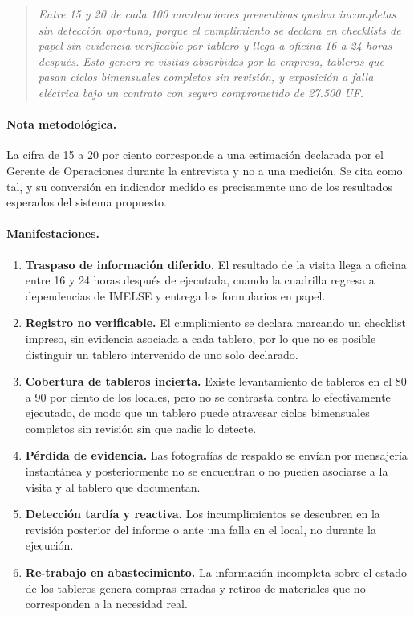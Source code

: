 \documentclass[10pt,letterpaper]{article}
\begin{document}
\begin{quote}
\itshape
Entre 15 y 20 de cada 100 mantenciones preventivas quedan incompletas sin detección
oportuna, porque el cumplimiento se declara en checklists de papel sin evidencia
verificable por tablero y llega a oficina 16 a 24 horas después. Esto genera
re-visitas absorbidas por la empresa, tableros que pasan ciclos bimensuales completos
sin revisión, y exposición a falla eléctrica bajo un contrato con seguro comprometido
de 27.500 UF.
\end{quote}

\paragraph{Nota metodológica.} La cifra de 15 a 20 por ciento corresponde a una
estimación declarada por el Gerente de Operaciones durante la entrevista y no a una
medición. Se cita como tal, y su conversión en indicador medido es precisamente uno
de los resultados esperados del sistema propuesto.

\paragraph{Manifestaciones.}
\begin{enumerate}[label=P\arabic*.,leftmargin=*]
  \item \textbf{Traspaso de información diferido.} El resultado de la visita llega a
  oficina entre 16 y 24 horas después de ejecutada, cuando la cuadrilla regresa a
  dependencias de IMELSE y entrega los formularios en papel.
  \item \textbf{Registro no verificable.} El cumplimiento se declara marcando un
  checklist impreso, sin evidencia asociada a cada tablero, por lo que no es posible
  distinguir un tablero intervenido de uno solo declarado.
  \item \textbf{Cobertura de tableros incierta.} Existe levantamiento de tableros en
  el 80 a 90 por ciento de los locales, pero no se contrasta contra lo efectivamente
  ejecutado, de modo que un tablero puede atravesar ciclos bimensuales completos sin
  revisión sin que nadie lo detecte.
  \item \textbf{Pérdida de evidencia.} Las fotografías de respaldo se envían por
  mensajería instantánea y posteriormente no se encuentran o no pueden asociarse a la
  visita y al tablero que documentan.
  \item \textbf{Detección tardía y reactiva.} Los incumplimientos se descubren en la
  revisión posterior del informe o ante una falla en el local, no durante la
  ejecución.
  \item \textbf{Re-trabajo en abastecimiento.} La información incompleta sobre el
  estado de los tableros genera compras erradas y retiros de materiales que no
  corresponden a la necesidad real.
\end{enumerate}
\end{document}
